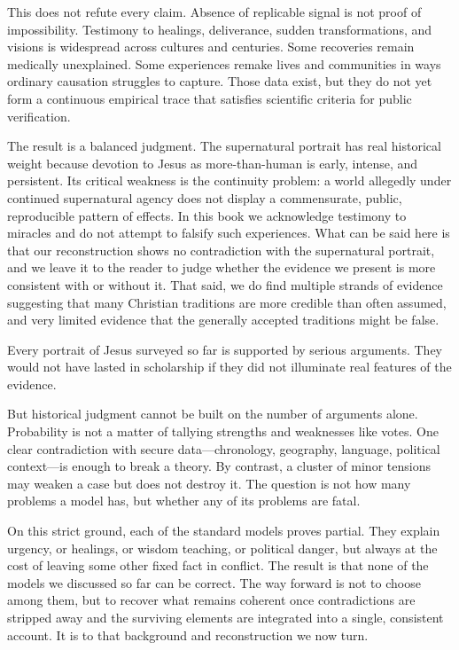 This does not refute every claim.
Absence of replicable signal is not proof of impossibility.
Testimony to healings, deliverance, sudden transformations, and visions is widespread across cultures and centuries.
Some recoveries remain medically unexplained.
Some experiences remake lives and communities in ways ordinary causation struggles to capture.
Those data exist, but they do not yet form a continuous empirical trace that satisfies scientific criteria for public verification.

The result is a balanced judgment.
The supernatural portrait has real historical weight because devotion to Jesus as more-than-human is early, intense, and persistent.
Its critical weakness is the continuity problem: a world allegedly under continued supernatural agency does not display a commensurate, public, reproducible pattern of effects.
In this book we acknowledge testimony to miracles and do not attempt to falsify such experiences.
What can be said here is that our reconstruction shows no contradiction with the supernatural portrait, and we leave it to the reader to judge whether the evidence we present is more consistent with or without it.
That said, we do find multiple strands of evidence suggesting that many Christian traditions are more credible than often assumed, and very limited evidence that the generally accepted traditions might be false.

\medskip

Every portrait of Jesus surveyed so far is supported by serious arguments.
They would not have lasted in scholarship if they did not illuminate real features of the evidence.

But historical judgment cannot be built on the number of arguments alone.
Probability is not a matter of tallying strengths and weaknesses like votes.
One clear contradiction with secure data—chronology, geography, language, political context—is enough to break a theory.
By contrast, a cluster of minor tensions may weaken a case but does not destroy it.
The question is not how many problems a model has, but whether any of its problems are fatal.

On this strict ground, each of the standard models proves partial.
They explain urgency, or healings, or wisdom teaching, or political danger, but always at the cost of leaving some other fixed fact in conflict.
The result is that none of the models we discussed so far can be correct.
The way forward is not to choose among them, but to recover what remains coherent once contradictions are stripped away and the surviving elements are integrated into a single, consistent account.
It is to that background and reconstruction we now turn.

